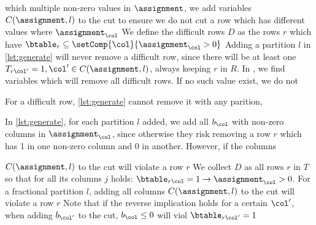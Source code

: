{which multiple non-zero values in $\assignment$, we add variables $C(\assignment,l)$ to the cut to ensure we do not cut a row which has different values where $\assignment_\col$
We define the difficult rows $D$ as the rows $r$ which have $\btable_{r} \subseteq \setComp{\col}{\assignment_\col>0}$
Adding a partition $l$ in \cref{lst:generate} will never remove a difficult row, since there will be at least one $T_{r\col'} = 1, \col' \in C(\assignment,l)$, always keeping $r$ in $R$.
In , we find variables which will remove all difficult rows.
If no such value exist, we do not 

For a difficult row, \cref{lst:generate} cannot remove it with any parition,  


In \cref{lst:generate}, for each partition $l$ added, we add all $b_\col$ with non-zero columns in $\assignment_\col$, since otherwise they risk removing a row $r$ which has 1 in one non-zero column and 0 in another.
However, if the columns 

$C(\assignment,l)$ to the cut will violate a row $r$
We collect $D$ as all rows $r$ in $T$ so that for all its columns $j$ holds: $\btable_{r\col}=1 \rightarrow \assignment_\col>0$.
For a fractional partition $l$, adding all columns $C(\assignment,l)$ to the cut will violate a row $r$
Note that if the reverse implication holds for a certain $\col'$, when adding $b_{\col'}$ to the cut, $b_\col \leq 0$ will viol $\btable_{r\col'}=1$






}


